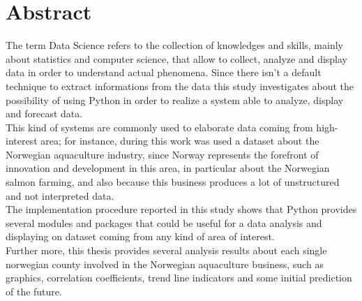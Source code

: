 \clearpage 

\chapter{Abstract}

The term Data Science refers to the collection of knowledges and skills, mainly about statistics and computer science, that allow to collect, analyze and display data in order to understand actual phenomena. Since there isn't a default technique to extract informations from the data this study investigates about the possibility of using Python in order to realize a system able to analyze, display and forecast data. \\
This kind of systems are commonly used to elaborate data coming from high-interest area; for instance, during this work was used a dataset about the Norwegian aquaculture industry, since Norway represents the forefront of innovation and development in this area, in particular about the Norwegian salmon farming, and also because this business produces a lot of unstructured and not interpreted data. \\
The implementation procedure reported in this study shows that Python provides several modules and packages that could be useful for a data analysis and displaying on dataset coming from any kind of area of interest. \\
Further more, this thesis provides several analysis results about each single norwegian county involved in the Norwegian aquaculture business, such as graphics, correlation coefficients, trend line indicators and some initial prediction of the future.




